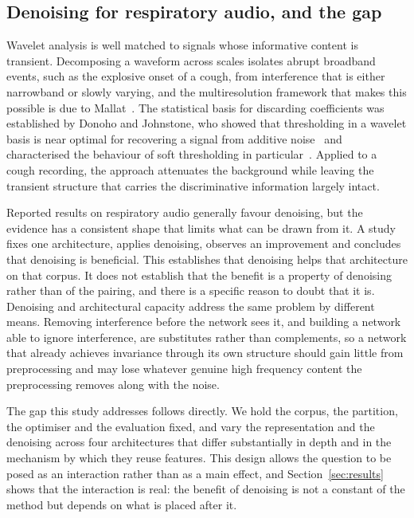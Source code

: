 \documentclass[pdflatex,sn-mathphys-num]{sn-jnl}
\begin{document}
\subsection{Denoising for respiratory audio, and the gap}\label{sec:rel-denoise}

Wavelet analysis is well matched to signals whose informative content is
transient. Decomposing a waveform across scales isolates abrupt broadband
events, such as the explosive onset of a cough, from interference that is
either narrowband or slowly varying, and the multiresolution framework that
makes this possible is due to Mallat~\cite{mallat1989}. The statistical basis
for discarding coefficients was established by Donoho and Johnstone, who showed
that thresholding in a wavelet basis is near optimal for recovering a signal
from additive noise~\cite{donoho1994} and characterised the behaviour of soft
thresholding in particular~\cite{donoho1995}. Applied to a cough recording, the
approach attenuates the background while leaving the transient structure that
carries the discriminative information largely intact.

Reported results on respiratory audio generally favour denoising, but the
evidence has a consistent shape that limits what can be drawn from it. A study
fixes one architecture, applies denoising, observes an improvement and
concludes that denoising is beneficial. This establishes that denoising helps
that architecture on that corpus. It does not establish that the benefit is a
property of denoising rather than of the pairing, and there is a specific
reason to doubt that it is. Denoising and architectural capacity address the
same problem by different means. Removing interference before the network sees
it, and building a network able to ignore interference, are substitutes rather
than complements, so a network that already achieves invariance through its own
structure should gain little from preprocessing and may lose whatever genuine
high frequency content the preprocessing removes along with the noise.

The gap this study addresses follows directly. We hold the corpus, the
partition, the optimiser and the evaluation fixed, and vary the representation
and the denoising across four architectures that differ substantially in depth
and in the mechanism by which they reuse features. This design allows the
question to be posed as an interaction rather than as a main effect, and
Section~\ref{sec:results} shows that the interaction is real: the benefit of
denoising is not a constant of the method but depends on what is placed after
it.
\end{document}
